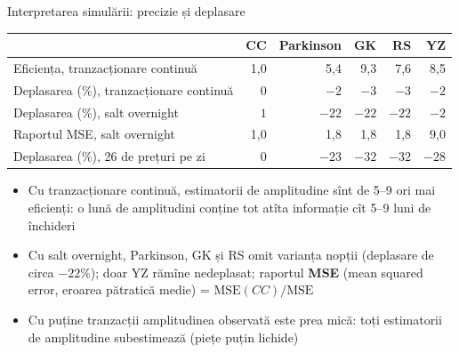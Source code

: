 \begin{frame}{Interpretarea simulării: precizie și deplasare}
\itemsize{\footnotesize}
\begin{center}
\footnotesize
\begin{tabular}{lrrrrr}
\toprule
& \textbf{CC} & \textbf{Parkinson} & \textbf{GK} & \textbf{RS} & \textbf{YZ} \\
\midrule
Eficiența, tranzacționare continuă & 1{,}0 & 5{,}4 & 9{,}3 & 7{,}6 & 8{,}5 \\
Deplasarea (\%), tranzacționare continuă & ${0}$ & ${-2}$ & ${-3}$ & ${-3}$ & ${-2}$ \\
Deplasarea (\%), salt overnight & ${1}$ & ${-22}$ & ${-22}$ & ${-22}$ & ${-2}$ \\
Raportul MSE, salt overnight & 1{,}0 & 1{,}8 & 1{,}8 & 1{,}8 & 9{,}0 \\
Deplasarea (\%), 26 de prețuri pe zi & ${0}$ & ${-23}$ & ${-32}$ & ${-32}$ & ${-28}$ \\
\bottomrule
\end{tabular}
\end{center}
\begin{itemize}
    \item Cu tranzacționare continuă, estimatorii de amplitudine sînt de 5--9 ori mai eficienți: o lună de amplitudini conține tot atîta informație cît 5--9 luni de închideri
    \item Cu salt overnight, Parkinson, GK și RS omit varianța nopții (deplasare de circa $-22\%$); doar YZ rămîne nedeplasat; raportul \textbf{MSE} (mean squared error, eroarea pătratică medie) = $\mathrm{MSE}(CC)/\mathrm{MSE}$
    \item Cu puține tranzacții amplitudinea observată este prea mică: toți estimatorii de amplitudine subestimează (piețe puțin lichide) 
\end{itemize}
\end{frame}

